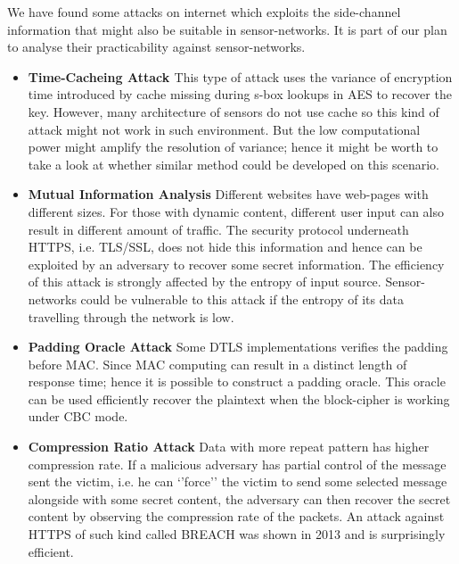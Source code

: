 We have found some attacks on internet which exploits the side-channel information that might also be suitable in sensor-networks. It is part of our plan to analyse their practicability against sensor-networks.

\begin{itemize}
\item {\bf Time-Cacheing Attack\cite{Cache-Timing1} \cite{Cache-Timing2}} This type of attack uses the variance of encryption time introduced by cache missing during s-box lookups in AES to recover the key. However, many architecture of sensors do not use cache so this kind of attack might not work in such environment. But the low computational power might amplify the resolution of variance; hence it might be worth to take a look at whether similar method could be developed on this scenario.

\item {\bf Mutual Information Analysis\cite{Web1}\cite{Web2}} Different websites have web-pages with different sizes. For those with dynamic content, different user input can also result in different amount of traffic. The security protocol underneath HTTPS, i.e. TLS/SSL, does not hide this information and hence can be exploited by an adversary to recover some secret information. The efficiency of this attack is strongly affected by the entropy of input source. Sensor-networks could be vulnerable to this attack if the entropy of its data travelling through the network is low.

\item {\bf Padding Oracle Attack\cite{Padding_Oracle}} Some DTLS implementations verifies the padding before MAC. Since MAC computing can result in a distinct length of response time; hence it is possible to construct a padding oracle. This oracle can be used efficiently recover the plaintext when the block-cipher is working under CBC mode.

\item {\bf Compression Ratio Attack\cite{Compression_Ratio_Attack}\cite{BREACH}} Data with more repeat pattern has higher compression rate. If a malicious adversary has partial control of the message sent the victim, i.e. he can `'force'' the victim to send some selected message alongside with some secret content, the adversary can then recover the secret content by observing the compression rate of the packets. An attack against HTTPS of such kind called BREACH\cite{BREACH} was shown in 2013 and is surprisingly efficient.
\end{itemize}

